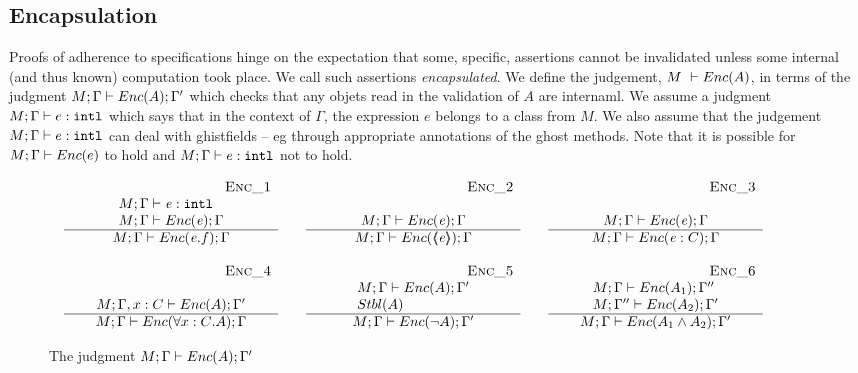 \completeProof




\subsection{Encapsulation}

{
Proofs of adherence to {\SpecLang specifications  hinge on the expectation that some, 
specific, assertions cannot be invalidated unless some 
} internal (and thus known) computation took place. 
{We call such assertions   \emph{encapsulated}.}
}
We define the  judgement,  $M\ \vdash  {\ensuremath Enc( A )}$, in terms of the judgment  $M; \Gamma \vdash {\ensuremath Enc( A )}  ; \Gamma'$
which checks that any objets read  in the validation of $A$ are internaml.
We assume a judgment $M; \Gamma \vdash e :  \mbox{\normalfont{\texttt{intl}}}$ which says that in the context of $\Gamma$, the expression $e$ belongs to a class from $M$.
We also assume that the judgement $M; \Gamma \vdash e :  \mbox{\normalfont{\texttt{intl}}}$ can deal with ghistfields -- eg through appropriate annotations of the ghost methods.
Note that it is possible for $M; \Gamma \vdash {\ensuremath Enc( e )}$ to hold and 
$M; \Gamma \vdash  e : \mbox{\normalfont{\texttt{intl}}}$ not to hold.


\begin{figure}[thb]
$
\begin{array}{l}
\begin{array}{lclcl}
\begin{array}{c} \strut \ \ \ \ \ \ \ \ \ \ \ \ \ \ \ \ \ \ \ \ \ \ \ \ \ \ \ \ \ \ \ {{\mbox{~ \strut  {\sc{Enc\_1}}}}} \\   
\begin{array}{l}
M; \Gamma \vdash \mathit{e} : \mbox{\normalfont{\texttt{intl}}} \\
M; \Gamma \vdash {\ensuremath Enc( \mathit{e})}; \Gamma
\end{array}
 \\ \hline 
M; \Gamma \vdash {\ensuremath Enc( \mathit{e}.f )}; \Gamma
 \end{array}
& &
\begin{array}{c} \strut \ \ \ \ \ \ \ \ \ \ \ \ \ \ \ \ \ \ \ \ \ \ \ \ \ \ \ \ \ \ \ {{\mbox{~ \strut  {\sc{Enc\_2}}}}} \\   
\\
M; \Gamma \vdash {\ensuremath Enc( \mathit{e})}; \Gamma 
 \\ \hline 
M; \Gamma \vdash {\ensuremath Enc( \ensuremath{\langle\!\!\langle \mathit{e} \rangle\!\!\rangle} )}; \Gamma
 \end{array}
& &
\begin{array}{c} \strut \ \ \ \ \ \ \ \ \ \ \ \ \ \ \ \ \ \ \ \ \ \ \ \ \ \ \ \ \ \ \ {{\mbox{~ \strut  {\sc{Enc\_3}}}}} \\   
\\
M; \Gamma \vdash {\ensuremath Enc( \mathit{e})}; \Gamma 
 \\ \hline 
M; \Gamma \vdash {\ensuremath Enc( \mathit{e}:C )}; \Gamma
 \end{array}
\\ \\ 
\begin{array}{c} \strut \ \ \ \ \ \ \ \ \ \ \ \ \ \ \ \ \ \ \ \ \ \ \ \ \ \ \ \ \ \ \ {{\mbox{~ \strut  {\sc{Enc\_4}}}}} \\   
\\
M; \Gamma, {x:C} \vdash {\ensuremath Enc( A )}; \Gamma' 
 \\ \hline 
M; \Gamma \vdash {\ensuremath Enc( \forall {x:C}. A )}; \Gamma
 \end{array}
&   &
\begin{array}{c} \strut \ \ \ \ \ \ \ \ \ \ \ \ \ \ \ \ \ \ \ \ \ \ \ \ \ \ \ \ \ \ \ {{\mbox{~ \strut  {\sc{Enc\_5}}}}} \\    
\begin{array}{l}
M; \Gamma \vdash {\ensuremath Enc( A )}; \Gamma'\\  {Stbl( A )}
\end{array}
 \\ \hline 
M; \Gamma \vdash {\ensuremath Enc(  \neg A )}; \Gamma'  
 \end{array}
&    &
\begin{array}{c} \strut \ \ \ \ \ \ \ \ \ \ \ \ \ \ \ \ \ \ \ \ \ \ \ \ \ \ \ \ \ \ \ {{\mbox{~ \strut  {\sc{Enc\_6}}}}} \\   
\begin{array}{l}
M; \Gamma \vdash {\ensuremath Enc( A_1 )}; \Gamma''   \\
  M; \Gamma'' \vdash {\ensuremath Enc(  A_2 )}; \Gamma' 
  \end{array} 
 \\ \hline 
M; \Gamma \vdash {\ensuremath Enc( A_1 \wedge A_2 )}; \Gamma'
 \end{array}
\end{array}
\end{array}
$
\caption{The judgment $M; \Gamma \vdash {\ensuremath Enc( A )}; \Gamma'$}
\label{f:encaps}
\end{figure}

